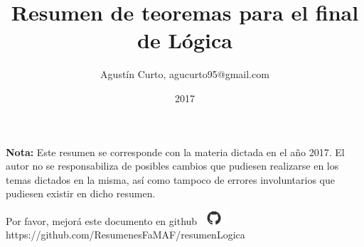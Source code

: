 \documentclass[12pt,a4paper]{article}
\author{Agustín Curto, agucurto95@gmail.com}
\title{Resumen de teoremas para el final \\ de Lógica}
\date{2017}
\newcommand{\PN}{\par\noindent}
\begin{document}
	\clearpage\maketitle
	\thispagestyle{empty}
	\tableofcontents

	\vspace{5cm}
	\PN \textbf{Nota:} Este resumen se corresponde con la materia dictada en el año 2017. El autor no se responsabiliza de
	posibles cambios que pudiesen realizarse en los temas dictados en la misma, así como tampoco de errores involuntarios
	que pudiesen existir en dicho resumen.

	\vspace{\fill}
	\begin{center}
		Por favor, mejorá este documento en github
		\includegraphics[width=1cm]{graphics/github.png} \\
		https://github.com/ResumenesFaMAF/resumenLogica
	\end{center}

	\pagebreak

	
	
	
	
	
\end{document}
